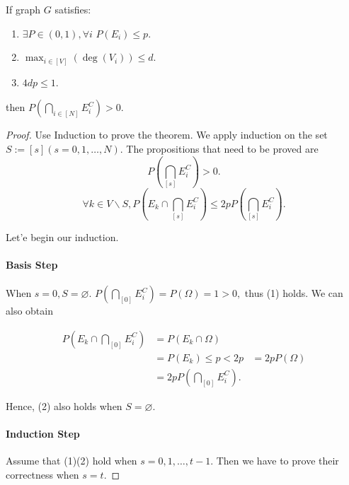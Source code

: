 \begin{theorem}
  If graph $G$ satisfies:
  \begin{enumerate}
    \item $\exists P\in (0,1), \forall i$ $P(E_i) \leq p.$
    \item $\max_{i\in [V]}(\deg(V_i)) \leq d$.
    \item $4dp \leq 1$.
  \end{enumerate}
  
  then $P(\bigcap _{i\in [N]} E_i^C) > 0.$
  
\end{theorem}
 \begin{proof}
   Use Induction to prove the theorem. We apply induction on the set $S:= [s](s = 0,1,\dots,N).$
      The propositions that need to be proved are
   \begin{equation}
     P(\bigcap_{[s]}E_i^C) > 0.
   \end{equation}
   \begin{equation}
     \forall k\in V\backslash S, P(E_k \cap \bigcap_{[s]}E_i^C) \leq 2pP(\bigcap_{[s]}E_i^C).  
   \end{equation}
   
   Let'e begin our induction.
   
   \paragraph{Basis Step} When $s = 0, S = \varnothing$. $P(\bigcap_{[0]}E_i^C) = P(\Omega) = 1 > 0,$ thus (1) holds. We can also obtain 
   
   \begin{equation}
   \nonumber
   \begin{aligned}
      P(E_k \cap \bigcap_{[0]}E_i^C) &= P(E_k \cap \Omega)\\
       &= P(E_k) \leq p < 2p  &= 2pP(\Omega)\\
        &= 2p P(\bigcap_{[0]}E_i^C).
   \end{aligned}
   \end{equation}
   
   Hence, (2) also holds when $S = \varnothing$.
   
   \paragraph{Induction Step}
   Assume that (1)(2) hold when $s = 0,1,\dots, t-1$. Then we have to prove their correctness when  $s = t$.
   

\end{proof}
